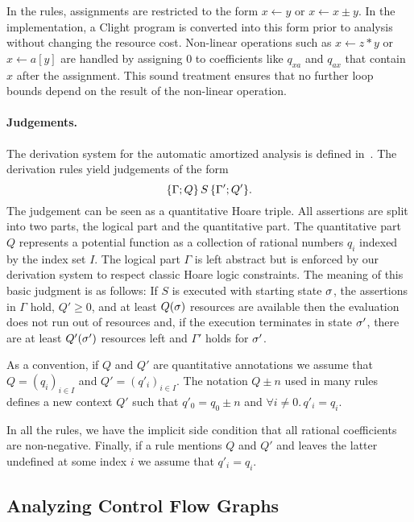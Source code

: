 \documentclass[letterpaper,11pt]{article}
\newcommand{\pref}[1]{\prettyref{#1}}
\begin{document}
In the rules, assignments are restricted to the form $x \gets
y$ or $x \gets x \pm y$.  In the implementation, a Clight
program is converted into this form prior to analysis without changing
the resource cost.
Non-linear operations such as $x \gets z*y$ or $x \gets
a[y]$ are handled by assigning $0$ to coefficients
like $q_{xa}$ and $q_{ax}$ that contain $x$ after the assignment.
This sound treatment ensures that no further loop bounds
depend on the result of the non-linear operation.

\paragraph{Judgements.}

The derivation system for the automatic amortized analysis is defined
in~\pref{fig:auto}.  The derivation rules yield judgements of the form
$$
    \{ \Gamma; Q \}\,  S \, \{ \Gamma'; Q' \}.
$$
%
The judgement
can be seen as a quantitative Hoare triple.  All assertions are split into
two parts, the logical part and the quantitative part.  The
quantitative part $Q$ represents a potential function as a collection
of rational numbers $q_i$ indexed by the index set $I$.  The
logical part $\Gamma$ is left abstract but is enforced by our
derivation system to respect classic Hoare logic constraints.
%
The meaning of this basic judgment is as follows: If $S$ is executed
with starting state $\sigma$, the assertions in $\Gamma$
hold, $Q' {\ge} 0$, and at least $Q(\sigma)$ resources are available then the
evaluation does not run out of resources and, if the execution
terminates in state $\sigma'$, there are at least $Q'(\sigma')$
resources left and $\Gamma'$ holds for $\sigma'$.


As a convention, if $Q$ and $Q'$ are quantitative annotations
we assume that $Q = (q_i)_{i\in I}$ and $Q' = (q'_i)_{i \in I}$.
The notation $Q \pm n$ used in many rules defines a new context $Q'$
such that $q'_0 = q_0 \pm n$ and $\forall i \neq 0 .\, q'_i = q_i$.

In all the rules, we have the implicit side condition that all rational
coefficients are non-negative.
%
Finally, if a rule mentions $Q$ and $Q'$
and leaves the latter undefined at some index $i$ we assume that $q'_i = q_i$.

\subsection{Analyzing Control Flow Graphs}
\end{document}
